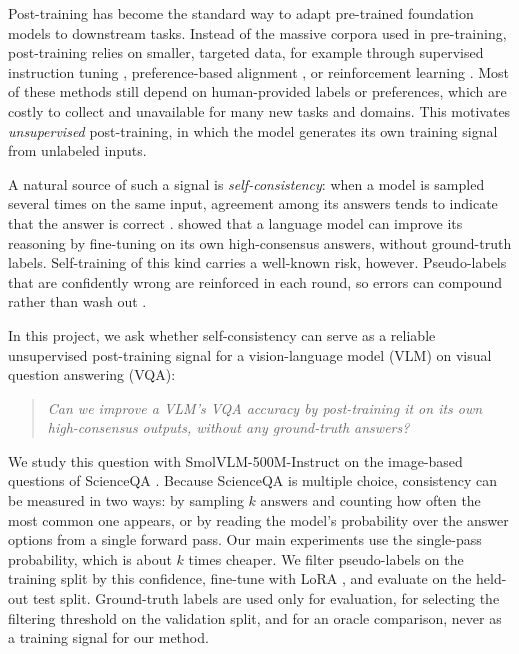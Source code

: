 \documentclass{article}
\begin{document}
Post-training has become the standard way to adapt pre-trained foundation models to downstream tasks. Instead of the massive corpora used in pre-training, post-training relies on smaller, targeted data, for example through supervised instruction tuning \citep{wei2022flan}, preference-based alignment \citep{ouyang2022instructgpt}, or reinforcement learning \citep{chu2025sft}. Most of these methods still depend on human-provided labels or preferences, which are costly to collect and unavailable for many new tasks and domains. This motivates \emph{unsupervised} post-training, in which the model generates its own training signal from unlabeled inputs.

A natural source of such a signal is \emph{self-consistency}: when a model is sampled several times on the same input, agreement among its answers tends to indicate that the answer is correct \citep{wang2023selfconsistency}. \citet{huang2023selfimprove} showed that a language model can improve its reasoning by fine-tuning on its own high-consensus answers, without ground-truth labels. Self-training of this kind carries a well-known risk, however. Pseudo-labels that are confidently wrong are reinforced in each round, so errors can compound rather than wash out \citep{arazo2020confirmation}.

In this project, we ask whether self-consistency can serve as a reliable unsupervised post-training signal for a vision-language model (VLM) on visual question answering (VQA):
\begin{quote}
\emph{Can we improve a VLM's VQA accuracy by post-training it on its own high-consensus outputs, without any ground-truth answers?}
\end{quote}
We study this question with SmolVLM-500M-Instruct \citep{marafioti2025smolvlm} on the image-based questions of ScienceQA \citep{lu2022scienceqa}. Because ScienceQA is multiple choice, consistency can be measured in two ways: by sampling $k$ answers and counting how often the most common one appears, or by reading the model's probability over the answer options from a single forward pass. Our main experiments use the single-pass probability, which is about $k$ times cheaper. We filter pseudo-labels on the training split by this confidence, fine-tune with LoRA \citep{hu2022lora}, and evaluate on the held-out test split. Ground-truth labels are used only for evaluation, for selecting the filtering threshold on the validation split, and for an oracle comparison, never as a training signal for our method.
\end{document}
